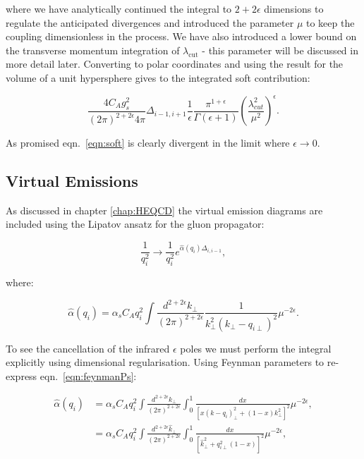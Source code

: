 			where we have analytically continued the integral to $2+2\epsilon$ dimensions to regulate the anticipated
			divergences and introduced the parameter $\mu$ to keep the coupling dimensionless in the process.
			We have also introduced a lower bound on the transverse momentum integration of $\lambda_{\text{cut}}$ -
			this parameter will be discussed in more detail later.
			Converting to polar coordinates and using the result for the volume of a unit hypersphere gives
			to the integrated soft contribution:

			\begin{equation}
				\frac{4C_Ag_s^2}{(2\pi)^{2+2\epsilon}4\pi}\Delta_{i-1, i+1}
				\frac{1}{\epsilon}\frac{\pi^{1+\epsilon}}
				{\Gamma(\epsilon+1)}\left(\frac{\lambda_{cut}^2}{\mu^2}\right)^\epsilon.
				\label{eqn:soft}
			\end{equation}

			As promised eqn.~\eqref{eqn:soft} is clearly divergent in the limit where $\epsilon\to0$.

	\subsection{Virtual Emissions}
		\label{sub:subsection_name}

		As discussed in chapter \ref{chap:HEQCD} the virtual emission diagrams are included
		using the Lipatov ansatz for the gluon propagator:

		\begin{equation}
			\frac{1}{q_i^2}\longrightarrow\frac{1}{q_i^2}e^{\hat{\alpha}(q_i)\Delta_{i,i-1}},
		\end{equation}

		where:

		\begin{equation}
			\hat{\alpha}(q_i) = \alpha_sC_Aq_i^2\int \frac{d^{2+2\epsilon}k_{\perp}}{(2\pi)^{2+2\epsilon}}
			\frac{1}{k^2_\perp(k_\perp - q_{i\perp})^2}\mu^{-2\epsilon}.
			\label{eqn:feynmanPs}
		\end{equation}

		To see the cancellation of the infrared $\epsilon$ poles we must perform the integral
		explicitly using dimensional regularisation. Using Feynman parameters to re-express
		eqn.~\eqref{eqn:feynmanPs}:

		\begin{align}
			\hat{\alpha}(q_i) &= \alpha_sC_Aq_i^2\int \frac{d^{2+2\epsilon}k_{\perp}}{(2\pi)^{2+2\epsilon}}\int_0^1
				\frac{dx}{[x(k - q_{i})^2_\perp + (1-x)k_\perp^2]^2}\mu^{-2\epsilon}, \\
				&= \alpha_sC_Aq_i^2\int \frac{d^{2+2\epsilon}\hat{k}_{\perp}}{(2\pi)^{2+2\epsilon}}\int_0^1
				\frac{dx}{[\hat{k}^2 _\perp + q_{i\perp}^2(1-x)]^2}\mu^{-2\epsilon},
		\end{align}

